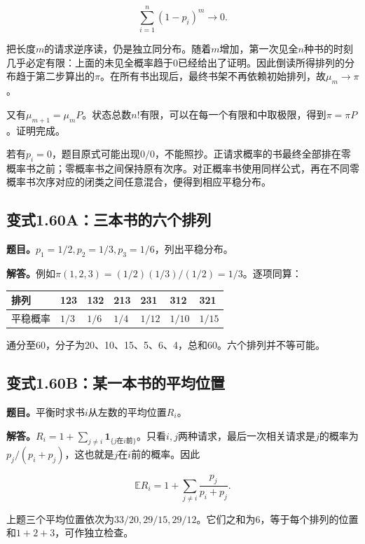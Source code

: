 \documentclass[
  11pt,a4paper,UTF8,fontset=fandol]{ctexart}
\begin{document}
\[
\sum_{i=1}^n(1-p_i)^m\longrightarrow0.
\]

把长度\(m\)的请求逆序读，仍是独立同分布。随着\(m\)增加，第一次见全\(n\)种书的时刻几乎必定有限：上面的未见全概率趋于0已经给出了证明。因此倒读所得排列的分布趋于第二步算出的\(\pi\)。在所有书出现后，最终书架不再依赖初始排列，故\(\mu_m\to\pi\)。

又有\(\mu_{m+1}=\mu_mP\)。状态总数\(n!\)有限，可以在每一个有限和中取极限，得到\(\pi=\pi P\)。证明完成。

若有\(p_i=0\)，题目原式可能出现\(0/0\)，不能照抄。正请求概率的书最终全部排在零概率书之前；零概率书之间保持原有次序。对正概率书使用同样公式，再在不同零概率书次序对应的闭类之间任意混合，便得到相应平稳分布。

\subsection{变式1.60A：三本书的六个排列}\label{ux53d8ux5f0f1.60aux4e09ux672cux4e66ux7684ux516dux4e2aux6392ux5217}

\textbf{题目。}\(p_1=1/2,p_2=1/3,p_3=1/6\)，列出平稳分布。

\textbf{解答。}例如\(\pi(1,2,3)=(1/2)(1/3)/(1/2)=1/3\)。逐项同算：

\begin{longtable}[]{@{}lllllll@{}}
\toprule\noalign{}
排列 & 123 & 132 & 213 & 231 & 312 & 321 \\
\midrule\noalign{}
\endhead
\bottomrule\noalign{}
\endlastfoot
平稳概率 & \(1/3\) & \(1/6\) & \(1/4\) & \(1/12\) & \(1/10\) &
\(1/15\) \\
\end{longtable}

通分至60，分子为20、10、15、5、6、4，总和60。六个排列并不等可能。

\subsection{变式1.60B：某一本书的平均位置}\label{ux53d8ux5f0f1.60bux67d0ux4e00ux672cux4e66ux7684ux5e73ux5747ux4f4dux7f6e}

\textbf{题目。}平衡时求书\(i\)从左数的平均位置\(R_i\)。

\textbf{解答。}\(R_i=1+\sum_{j\ne i}\mathbf1_{\{j\text{在}i\text{前}\}}\)。只看\(i,j\)两种请求，最后一次相关请求是\(j\)的概率为\(p_j/(p_i+p_j)\)，这也就是\(j\)在\(i\)前的概率。因此

\[
\boxed{\mathbb ER_i=1+\sum_{j\ne i}\frac{p_j}{p_i+p_j}.}
\]

上题三个平均位置依次为\(33/20,29/15,29/12\)。它们之和为6，等于每个排列的位置和\(1+2+3\)，可作独立检查。
\end{document}
